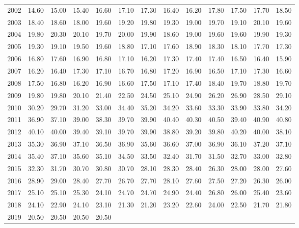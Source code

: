 \begin{longtable}{rrrrrrrrrrrrr}
  2002 & 14.60 & 15.00 & 15.40 & 16.60 & 17.10 & 17.30 & 16.40 & 16.20 & 17.80 & 17.50 & 17.70 & 18.50 \\ 
  2003 & 18.40 & 18.60 & 18.00 & 19.60 & 19.20 & 19.80 & 19.30 & 19.00 & 19.70 & 19.10 & 20.10 & 19.60 \\ 
  2004 & 19.80 & 20.30 & 20.10 & 19.70 & 20.00 & 19.90 & 18.60 & 19.00 & 19.60 & 19.60 & 19.90 & 19.30 \\ 
  2005 & 19.30 & 19.10 & 19.50 & 19.60 & 18.80 & 17.10 & 17.60 & 18.90 & 18.30 & 18.10 & 17.70 & 17.30 \\ 
  2006 & 16.80 & 17.60 & 16.90 & 16.80 & 17.10 & 16.20 & 17.30 & 17.40 & 17.40 & 16.50 & 16.40 & 15.90 \\ 
  2007 & 16.20 & 16.40 & 17.30 & 17.10 & 16.70 & 16.80 & 17.20 & 16.90 & 16.50 & 17.10 & 17.30 & 16.60 \\ 
  2008 & 17.50 & 16.80 & 16.20 & 16.90 & 16.60 & 17.50 & 17.10 & 17.40 & 18.40 & 19.70 & 18.80 & 19.70 \\ 
  2009 & 19.80 & 19.80 & 20.10 & 21.40 & 22.50 & 24.50 & 25.10 & 24.90 & 26.20 & 26.90 & 28.50 & 29.10 \\ 
  2010 & 30.20 & 29.70 & 31.20 & 33.00 & 34.40 & 35.20 & 34.20 & 33.60 & 33.30 & 33.90 & 33.80 & 34.20 \\ 
  2011 & 36.90 & 37.10 & 39.00 & 38.30 & 39.70 & 39.90 & 40.40 & 40.30 & 40.50 & 39.40 & 40.90 & 40.80 \\ 
  2012 & 40.10 & 40.00 & 39.40 & 39.10 & 39.70 & 39.90 & 38.80 & 39.20 & 39.80 & 40.20 & 40.00 & 38.10 \\ 
  2013 & 35.30 & 36.90 & 37.10 & 36.50 & 36.90 & 35.60 & 36.60 & 37.00 & 36.90 & 36.10 & 37.20 & 37.10 \\ 
  2014 & 35.40 & 37.10 & 35.60 & 35.10 & 34.50 & 33.50 & 32.40 & 31.70 & 31.50 & 32.70 & 33.00 & 32.80 \\ 
  2015 & 32.30 & 31.70 & 30.70 & 30.80 & 30.70 & 28.10 & 28.30 & 28.40 & 26.30 & 28.00 & 28.00 & 27.60 \\ 
  2016 & 28.90 & 29.00 & 28.40 & 27.70 & 26.70 & 27.70 & 28.10 & 27.60 & 27.50 & 27.20 & 26.30 & 26.00 \\ 
  2017 & 25.10 & 25.10 & 25.30 & 24.10 & 24.70 & 24.70 & 24.90 & 24.40 & 26.80 & 26.00 & 25.40 & 23.60 \\ 
  2018 & 24.10 & 22.90 & 24.10 & 23.10 & 21.30 & 21.20 & 23.20 & 22.60 & 24.00 & 22.50 & 21.70 & 21.80 \\ 
  2019 & 20.50 & 20.50 & 20.50 & 20.50 &  &  &  &  &  &  &  &  \\ 
   \hline
\hline
\end{longtable}
